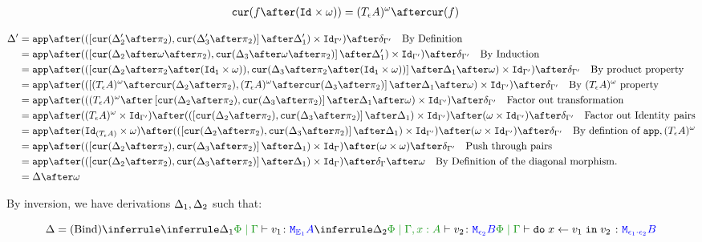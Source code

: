\documentclass{report}
\begin{document}
    \begin{align*}
        \cur{f\after(\Id{}\times \w)} & = (\tea)^{\w} \after\cur{f}
    \end{align*}

    \begin{align*}
        \D' & =\app\after((\fld{\cur{\D_2'\after\pp}}{\cur{\D_3'\after\pp}}\after\D_1')\times \Id{\G'})\after\diag{\G'}\qt{By Definition}\\
        & =\app\after((\fld{\cur{\D_2\after\w\after\pp}}{\cur{\D_3\after\w\after\pp}}\after\D_1')\times \Id{\G'})\after\diag{\G'}\qt{By Induction}\\
        & = \app\after((\fld{\cur{\D_2\after\pp\after(\Id{\1}\times \w)}}{\cur{\D_3\after\pp\after(\Id{\1}\times \w)}}\after\D_1\after\w)\times \Id{\G'})\after\diag{\G'}\qt{By product property}\\
        & = \app\after((\fld{(\tea)^{\w}\after\cur{\D_2\after\pp}}{(\tea)^{\w}\after\cur{\D_3\after\pp}}\after\D_1\after\w)\times \Id{\G'})\after\diag{\G'}\qt{By $(\tea)^{\w}$ property}\\
        & = \app\after(((\tea)^{\w}\after\fld{\cur{\D_2\after\pp}}{\cur{\D_3\after\pp}}\after\D_1\after\w)\times \Id{\G'})\after\diag{\G'}\qt{Factor out transformation}\\
        & = \app\after((\tea)^{\w}\times\Id{\G'})\after((\fld{\cur{\D_2\after\pp}}{\cur{\D_3\after\pp}}\after\D_1)\times \Id{\G'})\after(\w \times \Id{\G'})\after\diag{\G'}\qt{Factor out Identity pairs}\\
        & = \app\after(\Id{(\tea)}\times\w)\after((\fld{\cur{\D_2\after\pp}}{\cur{\D_3\after\pp}}\after\D_1) \times \Id{\G'})\after(\w \times \Id{\G'})\after\diag{\G'}\qt{By defintion of $\app, (\tea)^{\w}$}\\
        & = \app\after((\fld{\cur{\D_2\after\pp}}{\cur{\D_3\after\pp}}\after\D_1)\times \idg)\after(\w \times \w)\after\diag{\G'}\qt{Push through pairs}\\
        & = \app\after((\fld{\cur{\D_2\after\pp}}{\cur{\D_3\after\pp}}\after\D_1)\times \idg)\after\diag{\G}\after\w\qt{By Definition of the diagonal morphism.}\\
        & = \D\after\w
    \end{align*}

    By inversion, we have derivations $\Delta_1, \Delta_2$ such that:


    \begin{equation}
        \D = \ntreeruleII{Bind}{
            \treeruleI{\D_1}{\etyperelation{\P}{\G}{v_1}{\M{\E_1}{A}}}
            }{
            \treeruleI{\D_2}{\etyperelation{\P}{\G,x: A}{v_2}{\M{\e_2}{B}}}
        }{
            \etyperelation{\P}{\G}{\doin{x}{v_1}{v_2}}{\M{\e_1\dot\e_2}{B}}
        }
    \end{equation}
\end{document}
